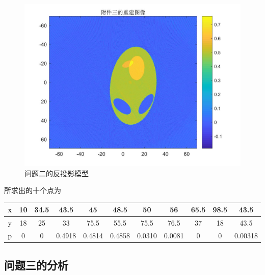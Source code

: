 \documentclass[withoutpreface,bwprint]{cumcmthesis} %
\begin{document}
\begin{figure}[H]
\centering
\includegraphics[width=.6\textwidth]{7.jpg}
\caption{问题二的反投影模型}
\end{figure}
所求出的十个点为
\begin{center}
\begin{tabular}{|c|c|c|c|c|c|c|c|c|c|c|}
 \hline
x    &  10   & 34.5   &  43.5       &  45          &  48.5        &  50           &  56          &  65.5      &  98.5   &  43.5\\ \hline 
y    &    18 &  25    &  33           &  75.5        &  55.5       &  75.5        &  76.5       &  37      &  18   &  43.5   \\ \hline
p    &   0    &  0      &  0.4918   &  0.4814   &  0.4858   &  0.0310   &  0.0081   &  0       &  0   &  0.00318\\ \hline
\end{tabular}
\end{center}


\subsection{问题三的分析}
\end{document}
